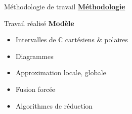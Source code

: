 \documentclass[french, 12pt]{beamer}
\begin{document}
\begin{frame}{Méthodologie de travail}
\underline{\textbf{Méthodologie}}
\small{
\begin{center}
\end{center}
}
\end{frame}

\begin{frame}{Travail réalisé}
\textbf{Modèle}
\begin{itemize}
    \item[\checkmark] Intervalles de $\mathbb C$ cartésiens \& polaires
    \item[\checkmark] Diagrammes
    \item[\checkmark] Approximation locale, globale
    \item[\checkmark] Fusion forcée
    \item[\checkmark] Algorithmes de réduction
\end{itemize}
\end{frame}
\end{document}
